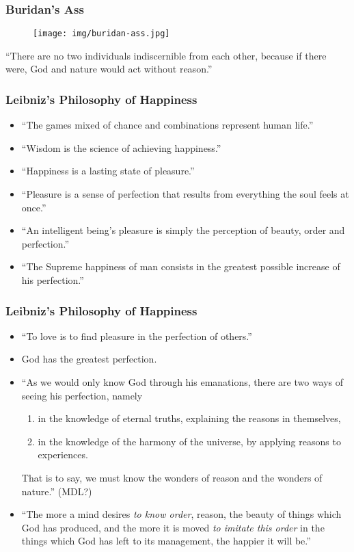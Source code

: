 \documentclass[UTF8,11pt,colorlinks,compress,openany]{beamer}%
\begin{document}
\begin{frame}\frametitle{Buridan's Ass}
\begin{figure}[H]
\texttt{[image: img/buridan-ass.jpg]}
\end{figure}
``There are no two individuals indiscernible from each other, because if there were, God and nature would act without reason.''
\end{frame}

\begin{frame}\frametitle{Leibniz's Philosophy of Happiness}
\begin{itemize}
	\item ``The games mixed of chance and combinations represent human life.''
	\item ``Wisdom is the science of achieving happiness.''
	\item ``Happiness is a lasting state of pleasure.''
	\item ``Pleasure is a sense of perfection that results from everything the soul feels at once.''
	\item ``An intelligent being's pleasure is simply the perception of beauty, order and perfection.''
	\item ``The Supreme happiness of man consists in the greatest possible increase of his perfection.''
\end{itemize}	
\end{frame}

\begin{frame}\frametitle{Leibniz's Philosophy of Happiness}
\begin{itemize}
	\item ``To love is to find pleasure in the perfection of others.''
	\item God has the greatest perfection.
	\item ``As we would only know God through his emanations, there are two ways of seeing his perfection, namely
	\begin{enumerate}
		\item in the knowledge of eternal truths, explaining the reasons in themselves,
		\item in the knowledge of the harmony of the universe, by applying reasons to experiences.
	\end{enumerate}
	That is to say, we must know the wonders of reason and the wonders of nature.'' (MDL?)
	\item ``The more a mind desires \emph{to know order}, reason, the beauty of things which God has produced, and the more it is moved \emph{to imitate this order} in the things which God has left to its management, the happier it will be.''
\end{itemize}
\end{frame}
\end{document}
